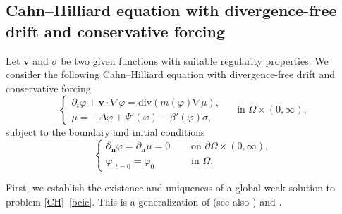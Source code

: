 \documentclass[11pt,reqno]{amsart}
\def\n{{\bm{n}}}
\def\div{\mathrm{div}}
\def\vv{\bm{v}}
\begin{document}
\subsection{Cahn--Hilliard equation with divergence-free drift and conservative forcing}
\label{sec:reg-CH}

Let $\vv$ and $\sigma$ be two given functions with suitable regularity properties. We consider the following Cahn--Hilliard equation with divergence-free drift and conservative forcing
%
\begin{equation}
\begin{cases}
\label{CH}
\partial_t \varphi+ \vv \cdot \nabla \varphi = \div(m(\varphi) \nabla \mu), \\
\mu= -\Delta \varphi+ \Psi'(\varphi) +  \beta'(\varphi) \sigma,
\end{cases}
\quad \text{ in } \Omega\times (0,\infty),
\end{equation}
%
subject to the boundary and initial conditions
\begin{equation}
\label{bcic}
\begin{cases}
\partial_\n \varphi=\partial_\n \mu=0 \quad &\text{ on } \partial \Omega \times (0,\infty),\\
\varphi|_{t=0}=\varphi_0\quad &\text{ in } \Omega.
\end{cases}
\end{equation}
%

First, we establish the existence and uniqueness of a global weak solution to problem  \eqref{CH}--\eqref{bcic}. This is a generalization of \cite[Theorem 6]{Abels2009} (see also \cite[Remark 2.2]{AGG2023}) and \cite[Theorem 1.2 - (A), (B)]{CGGG}.
\end{document}
